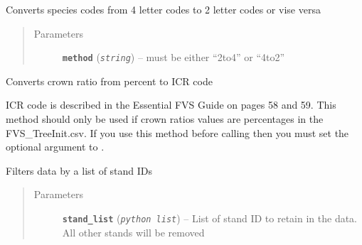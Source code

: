\documentclass[letterpaper,10pt,english]{sphinxmanual}
\begin{document}
\begin{fulllineitems}
\begin{fulllineitems}
\label{fuels_Inventory:fuels.Inventory.convert_sp_codes}
Converts species codes from 4 letter codes to 2 letter codes
or vise versa
\begin{quote}\begin{description}
\item[{Parameters}] \leavevmode
\textbf{\texttt{method}} (\emph{\texttt{string}}) -- must be either ``2to4'' or ``4to2''

\end{description}\end{quote}

\end{fulllineitems}


\begin{fulllineitems}
\label{fuels_Inventory:fuels.Inventory.crwratio_percent_to_code}
Converts crown ratio from percent to ICR code

ICR code is described in the Essential FVS Guide on pages 58 and 59.
This method should only be used if crown ratios values are percentages
in the FVS\_TreeInit.csv.  If you use this method before calling
 then you must set the optional argument
 to .

\end{fulllineitems}


\begin{fulllineitems}
\label{fuels_Inventory:fuels.Inventory.filter_by_stand}
Filters data by a list of stand IDs
\begin{quote}\begin{description}
\item[{Parameters}] \leavevmode
\textbf{\texttt{stand\_list}} (\emph{\texttt{python list}}) -- List of stand ID to retain in the data. All other
stands will be removed

\end{description}\end{quote}

\end{fulllineitems}


\end{fulllineitems}
\end{document}
